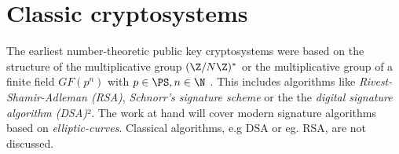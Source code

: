 \section{Classic cryptosystems}

The earliest number-theoretic public
key cryptosystems were based on the structure of the multiplicative
group $(\Z/N\Z)^*$ or the multiplicative group of a finite field $GF(p^n)$ with $p \in \PS, n \in \N$
\cite{bruce867}. This includes algorithms like \emph{Rivest-Shamir-Adleman (RSA)},
\emph{Schnorr's signature scheme} or the the \emph{digital signature algorithm (DSA)}².
The work at hand will cover modern signature algorithms based on \emph{elliptic-curves}.
Classical algorithms, e.g DSA or eg. RSA, are not discussed.